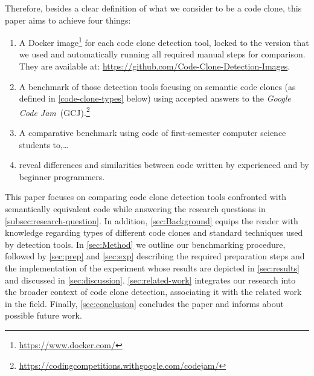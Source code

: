 \documentclass[10pt,journal,compsoc]{IEEEtran}
\def\todo#1{\textcolor{brown!80!yellow!70!black!90!red}{[\textsc{todo}: \textsf{#1}]}}
\newcommand*\urldate[2]{\url{#1}\;\textsuperscript{\color{gray}\DTMdate{#2}}}
\newcommand*\footurl[3][]{\footnote{#1\urldate{#2}{#3}}}
\begin{document}
Therefore, besides a clear definition of what we consider to be a code clone, this paper aims to achieve four things: \begin{enumerate}
  \item A Docker image\footurl{https://www.docker.com/}{2022-02-13} for each code clone detection tool, locked to the version that we used and automatically running all required manual steps for comparison. They are available at: \urldate{https://github.com/Code-Clone-Detection-Images}{2022-02-13}.
  \item A benchmark of those detection tools focusing on semantic code clones (as defined in \cref{code-clone-types} below) using accepted answers to the \textit{Google Code Jam}~(GCJ).\footurl{https://codingcompetitions.withgoogle.com/codejam/}{2022-02-13} %
  \item A comparative benchmark using code of first-semester computer science students to,\ldots
  \item reveal differences and similarities between code written by experienced and by beginner programmers.
\end{enumerate}
This paper focuses on comparing code clone detection tools confronted with
semantically equivalent code while answering the research questions in \cref{subsec:research-question}.
In addition, \cref{sec:Background} equips the reader with knowledge regarding types of different code clones and standard techniques used by detection tools.
In \cref{sec:Method} we outline our benchmarking procedure, followed by \cref{sec:prep} and \cref{sec:exp} describing the required preparation steps and the
implementation of the experiment whose results are depicted in \cref{sec:results} and discussed in \cref{sec:discussion}.
\cref{sec:related-work} integrates our research into the broader context of code clone detection, associating it with the related work in the field.
Finally, \cref{sec:conclusion} concludes the paper and informs about possible future work.
\end{document}
